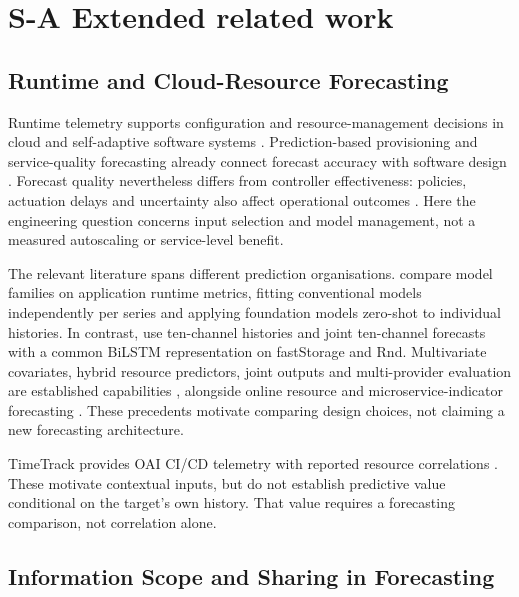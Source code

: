 \documentclass[a4paper,11pt]{article}
\begin{document}
\section*{S-A Extended related work}
\subsection*{Runtime and Cloud-Resource Forecasting}


Runtime telemetry supports configuration and resource-management decisions in
cloud and self-adaptive software systems
\citep{Taherizadeh2018Monitoring,Bauer2020SelfAware}. Prediction-based
provisioning and service-quality forecasting already connect forecast accuracy
with software design
\citep{Calheiros2015ARIMA,Syu2017DynamicQoS}. Forecast quality nevertheless
differs from controller effectiveness: policies, actuation delays and
uncertainty also affect operational outcomes \citep{Qu2018Autoscaling}.
Here the engineering question concerns input selection and model management,
not a measured autoscaling or service-level benefit.

The relevant literature spans different prediction organisations.
\citet{DiMenna2026RuntimeForecasting} compare model families on application
runtime metrics, fitting conventional models independently per series and
applying foundation models zero-shot to individual histories. In contrast,
\citet{Ullah2023CloudBiLSTM} use ten-channel histories and joint ten-channel
forecasts with a common BiLSTM representation on fastStorage and Rnd.
Multivariate covariates, hybrid resource predictors, joint outputs and
multi-provider evaluation are established capabilities
\citep{Tran2018MultivariateFuzzy,Xu2022esDNN,Tripathi2025MMRP,
Rossi2025CloudUncertainty,Zhang2025SWTCLSTM}, alongside online resource and
microservice-indicator forecasting \citep{Gao2026OMCR,Gao2026MaMiClif}.
These precedents motivate comparing design choices, not claiming a new
forecasting architecture.

TimeTrack provides OAI CI/CD telemetry with reported resource correlations
\citep{Meliani2025TimeTrack}. These motivate contextual inputs, but do not
establish predictive value conditional on the target's own history.
That value requires a forecasting comparison, not correlation alone.

\subsection*{Information Scope and Sharing in Forecasting}
\end{document}
